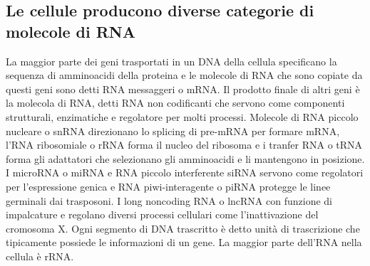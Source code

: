 \subsection{Le cellule producono diverse categorie di molecole di RNA}
La maggior parte dei geni trasportati in un DNA della cellula specificano la sequenza di amminoacidi della proteina e le molecole di RNA che sono copiate da questi geni sono detti RNA
messaggeri o mRNA. Il prodotto finale di altri geni \`e la molecola di RNA, detti RNA non codificanti che servono come componenti strutturali, enzimatiche e regolatore per molti 
processi. Molecole di RNA piccolo nucleare o snRNA direzionano lo splicing di pre-mRNA per formare mRNA, l'RNA ribosomiale o rRNA forma il nucleo del ribosoma e i tranfer RNA o tRNA
forma gli adattatori che selezionano gli amminoacidi e li mantengono in posizione. I microRNA o miRNA e RNA piccolo interferente siRNA servono come regolatori per l'espressione genica e 
RNA piwi-interagente o piRNA protegge le linee germinali dai trasposoni. I long noncoding RNA o lncRNA con funzione di impalcature e regolano diversi processi cellulari come
l'inattivazione del cromosoma X. Ogni segmento di DNA trascritto \`e detto unit\`a di trascrizione che tipicamente possiede le informazioni di un gene. La maggior parte dell'RNA nella
cellula \`e rRNA.
